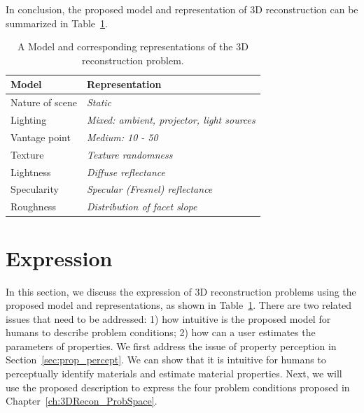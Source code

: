 In conclusion, the proposed model and representation of 3D reconstruction can be summarized in Table~\ref{tab:3DRecon_model_repre}.
\begin{table}[!htbp]
  \centering
  \begin{tabular}{l|l}
  \toprule
  \textbf{Model} & \textbf{Representation}\\
  \midrule
  Nature of scene & \textit{Static} \\
  Lighting & \textit{Mixed: ambient, projector, light sources} \\
  Vantage point & \textit{Medium: 10 - 50} \\
  Texture & \textit{Texture randomness}\\
  Lightness & \textit{Diffuse reflectance}\\
  Specularity & \textit{Specular (Fresnel) reflectance}\\
  Roughness & \textit{Distribution of facet slope}\\
  \bottomrule
  \end{tabular}
  \caption{A Model and corresponding representations of the 3D reconstruction problem.}
  \label{tab:3DRecon_model_repre}
\end{table}

\section{Expression}
\label{sec:3DRecon_Exp}
In this section, we discuss the expression of 3D reconstruction problems using the proposed model and representations, as shown in Table~\ref{tab:3DRecon_model_repre}. There are two related issues that need to be addressed: 1) how intuitive is the proposed model for humans to describe problem conditions; 2) how can a user estimates the parameters of properties. We first address the issue of property perception in Section~\ref{sec:prop_percept}. We can show that it is intuitive for humans to perceptually identify materials and estimate material properties. Next, we will use the proposed description to express the four problem conditions proposed in Chapter~\ref{ch:3DRecon_ProbSpace}.

